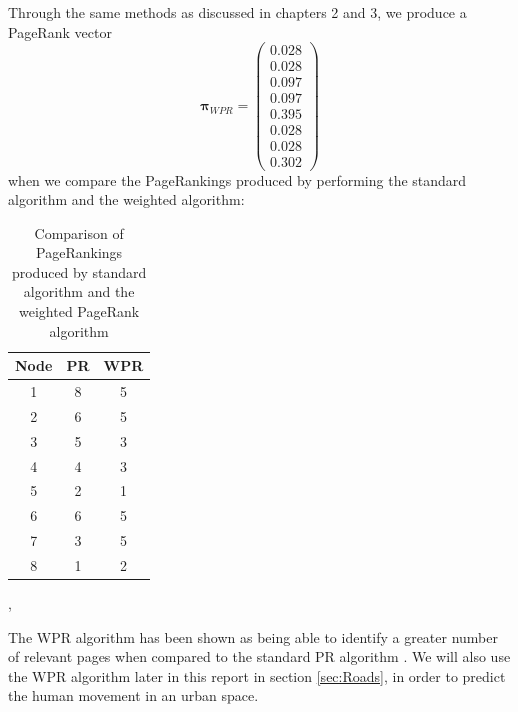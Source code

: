 \documentclass[11pt]{report}
\begin{document}
{Through the same methods as discussed in chapters 2 and 3, we produce a PageRank vector 
\[\boldsymbol\pi_{WPR} = \left(
\begin{array}{c}
0.028 \\
0.028 \\
0.097 \\
0.097 \\
0.395 \\
0.028 \\
0.028 \\
0.302
\end{array}
\right)\]
when we compare the PageRankings produced by performing the standard algorithm and the weighted algorithm:
\begin{table}[H] \caption{Comparison of PageRankings produced by standard algorithm and the weighted PageRank algorithm}
 \centering
 \begin{tabular} {c| c c} 
 Node & PR & WPR \\ [0.5ex] 
 \hline
 1&8&5\\
 2&6&5\\
 3&5&3\\
 4&4&3\\
 5&2&1\\
 6&6&5\\
 7&3&5\\
 8&1&2\\
 \end{tabular}
 \label{Table:WPR and PR}
\end{table}
\cite{langville}, \cite{baeza2004web}

The WPR algorithm has been shown as being able to identify a greater number of relevant pages when compared to the standard PR algorithm \cite{xing2004weighted}. We will also use the WPR algorithm later in this report in section \ref{sec:Roads}, in order to predict the human movement in an urban space. 

}
\end{document}
